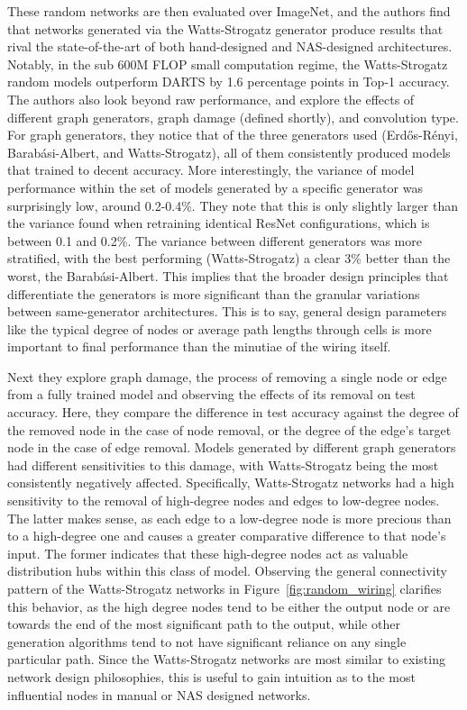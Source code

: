 These random networks are then evaluated over ImageNet, and the authors find that networks generated via the
Watts-Strogatz generator produce results that rival the state-of-the-art of both hand-designed and NAS-designed
architectures. Notably, in the sub 600M FLOP small computation regime, the Watts-Strogatz random models outperform DARTS
by 1.6 percentage points in Top-1 accuracy. The authors also look beyond raw performance, and explore the effects of different graph generators,
graph damage (defined shortly), and convolution type. For graph generators, they notice
that of the three generators used (Erd\H{o}s-R\'enyi, Barab\'asi-Albert, and Watts-Strogatz), all of them consistently
produced models that trained to decent accuracy. More interestingly, the variance of model
performance within the set of models generated by a specific generator was surprisingly low, around 0.2-0.4\%. They note
that this is only slightly larger than the variance found when retraining identical ResNet configurations, which is
between 0.1 and 0.2\%. The variance between different generators was more stratified,
with the best performing (Watts-Strogatz) a clear 3\% better than the worst, the Barab\'asi-Albert. This implies that the
broader design principles that differentiate the generators is more significant than the granular
variations between same-generator architectures. This is to say, general design parameters like the typical degree
of nodes or average path lengths through cells is more important to final performance than the minutiae of the wiring
itself.

Next they explore graph damage, the process of removing a single node or edge from a fully trained model and observing
the effects of its removal on test accuracy. Here, they compare the difference in test accuracy against the degree of the
removed node in the case of node removal, or the degree of the edge's target node in the case of edge removal. Models
generated by different graph generators had different sensitivities to this damage, with Watts-Strogatz being the
most consistently negatively affected. Specifically, Watts-Strogatz networks had a high sensitivity to the removal of
high-degree nodes and edges to low-degree nodes. The latter makes sense, as each edge to a low-degree node is more precious
than to a high-degree one and causes a greater comparative difference to that node's input. The former indicates that
these high-degree nodes act as valuable distribution hubs within this class of model. Observing the general connectivity
pattern of the Watts-Strogatz networks in Figure~\ref{fig:random_wiring} clarifies this behavior, as the high degree
nodes tend to be either the output node or are towards the end of the most significant path to the output,
while other generation algorithms tend to not have significant reliance on any single particular path. Since the Watts-Strogatz
networks are most similar to existing network design philosophies, this is useful to gain intuition as to the most
influential nodes in manual or NAS designed networks.

